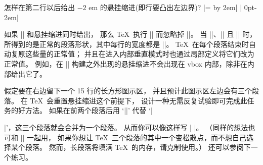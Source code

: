 \ddangerexercise 怎样在第二行以后给出 $-2$ em 的悬挂缩进(即行要凸出左边界)?
\answer |=\hsize \advance{} by 2em|\parbreak
| 0pt\hsize 0pt\hsize -2em|

\danger 如果 |\parshape| 和悬挂缩进同时给出，
那么 \TeX\ 执行 |\parshape| 而忽略掉 |\hangindent|。
当 ||、|\hangindent=0pt| 且 || 时，
所得到的是正常的段落形状，其中每行的宽度都是 |\hsize|。
\TeX\ 在每个段落结束时自动复原这些量的正常值；
并且在进入内部垂直模式时也通过局部定义将它们改为正常值。
例如，在 |\vbox| 构建之外出现的悬挂缩进不会出现在 vbox 内部，除非在内部给出它了。

\ddangerexercise 假定要在右边留下一个 15 行的长方形图示区，
并且预计此图示区左边会有三个段落。
在 \TeX\ 会重置悬挂缩进这个前提下，
设计一种无需反复试验即可完成此任务的好方法。
\answer 如果在前两个段落后用 `|\hfil\vadjust{\vskip\parskip}\break\indent|'
代替 `|\par|'，这三个段落就会合并为一个段落。
从而你可以像这样写 |\hangindent=-50pt |。
（同样的想法也可和 |\looseness| 一起用，
如果你想让 \TeX\ 三个\1段落的其中一个变松散点，而不想自己选择某个段落。
然而，长段落将填满 \TeX\ 的内存，请克制使用。）%
还可以参阅下一个练习。

